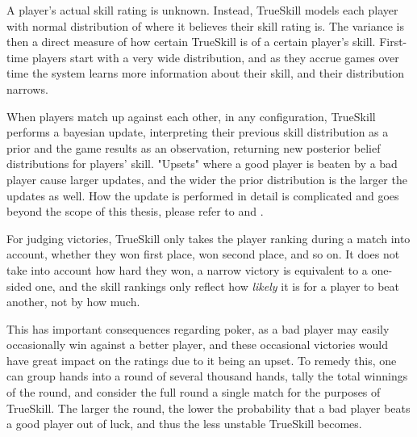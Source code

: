A player's actual skill rating is unknown. Instead, TrueSkill models each player with normal distribution of where it believes their skill rating is. The variance is then a direct measure of how certain TrueSkill is of a certain player's skill. First-time players start with a very wide distribution, and as they accrue games over time the system learns more information about their skill, and their distribution narrows.

When players match up against each other, in any configuration, TrueSkill performs a bayesian update, interpreting their previous skill distribution as a prior and the game results as an observation, returning new posterior belief distributions for players' skill. "Upsets" where a good player is beaten by a bad player cause larger updates, and the wider the prior distribution is the larger the updates as well. How the update is performed in detail is complicated and goes beyond the scope of this thesis, please refer to \cite{TrueSkill_original} and \cite{TrueSkill_blog}.

For judging victories, TrueSkill only takes the player ranking during a match into account, whether they won first place, won second place, and so on. It does not take into account how hard they won, a narrow victory is equivalent to a one-sided one, and the skill rankings only reflect how \textit{likely} it is for a player to beat another, not by how much.

This has important consequences regarding poker, as a bad player may easily occasionally win against a better player, and these occasional victories would have great impact on the ratings due to it being an upset. To remedy this, one can group hands into a round of several thousand hands, tally the total winnings of the round, and consider the full round a single match for the purposes of TrueSkill. The larger the round, the lower the probability that a bad player beats a good player out of luck, and thus the less unstable TrueSkill becomes.